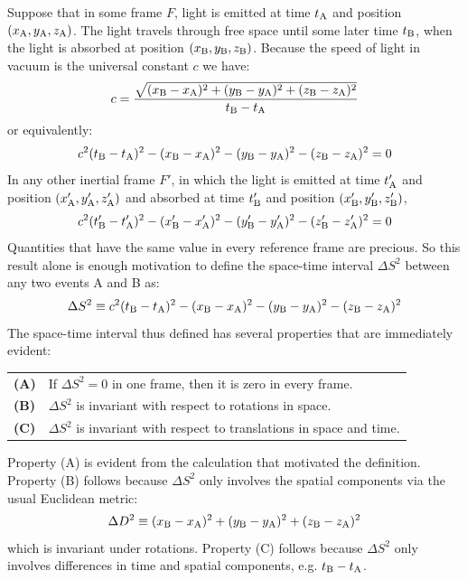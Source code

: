 \documentclass[12pt]{article}
\begin{document}
Suppose that in some frame $F$, light is emitted at time $t_{\rm A}$
and position $(x_{\rm A}, y_{\rm A}, z_{\rm A})$.  The light travels
through free space until some later time $t_{\rm B}$, when the light
is absorbed at position $(x_{\rm B}, y_{\rm B}, z_{\rm B})$.  Because
the speed of light in vacuum is the universal constant $c$ we have:
$$c = \frac{\sqrt{(x_{\rm B}-x_{\rm A})^2 + (y_{\rm B}-y_{\rm A})^2 + (z_{\rm B}-z_{\rm A})^2}}{t_{\rm B}-t_{\rm A}}$$
or equivalently:
$$c^2(t_{\rm B}-t_{\rm A})^2 - (x_{\rm B}-x_{\rm A})^2 - (y_{\rm B}-y_{\rm A})^2 - (z_{\rm B}-z_{\rm A})^2  = 0$$
In any other inertial frame $F'$, in which the light is
emitted at time $t'_{\rm A}$ and position $(x'_{\rm A}, y'_{\rm A}, z'_{\rm A})$ and absorbed
at time $t'_{\rm B}$ and position $(x'_{\rm B}, y'_{\rm B}, z'_{\rm B})$,
$$c^2(t'_{\rm B}-t'_{\rm A})^2 - (x'_{\rm B}-x'_{\rm A})^2 - (y'_{\rm B}-y'_{\rm A})^2 - (z'_{\rm B}-z'_{\rm A})^2  = 0$$
Quantities that have the same value in every reference frame are
precious.  So this result alone is enough motivation to define the space-time
interval $\Delta S^2$ between any two events A and B as:
\begin{equation}
\Delta S^2 \equiv c^2 (t_{\rm B}-t_{\rm A})^2 - (x_{\rm B}-x_{\rm A})^2 - (y_{\rm B}-y_{\rm A})^2 - (z_{\rm B}-z_{\rm A})^2
\end{equation}
The space-time interval thus defined has several properties that are immediately evident:
\begin{center}
\begin{tabular}{ll}
 {\bf (A)} & If $\Delta S^2 = 0$ in one frame, then it is zero in every frame.\\
 {\bf (B)} & $\Delta S^2$ is invariant with respect to rotations in space.\\
 {\bf (C)} & $\Delta S^2$ is invariant with respect to translations in space and time.\\
\end{tabular}
\end{center}
Property (A) is evident from the calculation that motivated the
definition.  Property (B) follows because $\Delta S^2$ only involves
the spatial components via the usual Euclidean metric:
$$\Delta D^2 \equiv (x_{\rm B}-x_{\rm A})^2 + (y_{\rm B}-y_{\rm A})^2 + (z_{\rm B}-z_{\rm A})^2$$
which is invariant under rotations.
Property (C) follows because $\Delta S^2$ only involves differences in time and spatial components, e.g. $t_{\rm B} - t_{\rm A}$.
\end{document}
